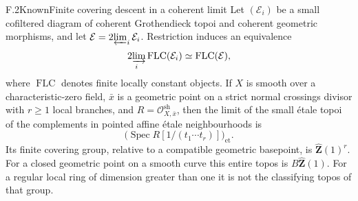 \begin{statement}{F.2}{Known}{Finite covering descent in a coherent limit}
Let $(\mathcal E_i)$ be a small cofiltered diagram of coherent
Grothendieck topoi and coherent geometric morphisms, and let
$\mathcal E=\operatorname*{2\!\varprojlim}_i\mathcal E_i$.
Restriction induces an equivalence
\[
 \operatorname*{2\!\varinjlim}_i\operatorname{FLC}(\mathcal E_i)
       \simeq \operatorname{FLC}(\mathcal E),
\]
where $\operatorname{FLC}$ denotes finite locally constant objects.
If $X$ is smooth over a characteristic-zero field, $\bar x$ is a geometric
point on a strict normal crossings divisor with $r\geq1$ local branches,
and $R=\mathcal O^{\mathrm{sh}}_{X,\bar x}$, then the limit of the small
\'etale topoi of the complements in pointed affine \'etale
neighbourhoods is
\[
 \bigl(\operatorname{Spec}R[1/(t_1\cdots t_r)]\bigr)_{\mathrm{et}}.
\]
Its finite covering group, relative to a compatible geometric basepoint,
is $\widehat{\mathbf Z}(1)^r$. For a closed geometric point on a smooth
curve this entire topos is $B\widehat{\mathbf Z}(1)$. For a regular local
ring of dimension greater than one it is not the classifying topos of
that group.
\end{statement}
